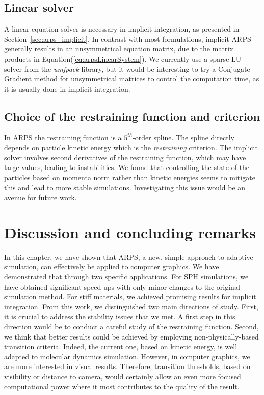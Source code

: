 \subsection{Linear solver}
A linear equation solver is necessary in implicit integration, as presented in Section~\ref{sec:arps_implicit}.
In contrast with most formulations, implicit ARPS generally results in an unsymmetrical equation matrix, due to the matrix products in Equation(\ref{eq:arpsLinearSystem}).
We currently use a sparse LU solver from the \emph{umfpack} library, but it would be interesting to try a Conjugate Gradient method for unsymmetrical matrices to control the computation time, as it is usually done in implicit integration.

\subsection{Choice of the restraining function and criterion}
In ARPS the restraining function is a $5^{th}$-order spline.
The spline directly depends on particle kinetic energy which is the \emph{restraining} criterion.
The implicit solver involves second derivatives of the restraining function, which may have large values, leading to instabilities.
We found that controlling the state of the particles based on momenta norm rather than kinetic energies seems to mitigate this and lead to more stable simulations.
Investigating this issue would be an avenue for future work.

\section{Discussion and concluding remarks} 
\label{sec:arps_discussion}
In this chapter, we have shown that ARPS, a new, simple approach to adaptive simulation, can effectively be applied to computer graphics. 
We have demonstrated that through two specific applications.
For SPH simulations, we have obtained significant speed-ups with only minor changes to the original simulation method.
For stiff materials, we achieved promising results for implicit integration.
From this work, we distinguished two main directions of study.
First, it is crucial to address the stability issues that we met. 
A first step in this direction would be to conduct a careful study of the restraining function.
Second, we think that better results could be achieved by employing non-physically-based transition criteria. 
Indeed, the current one, based on kinetic energy, is well adapted to molecular dynamics simulation. 
However, in computer graphics, we are more interested in visual results.
Therefore, transition thresholds, based on visibility or distance to camera, would certainly allow an even more focused computational power where it most contributes to the quality of the result.
